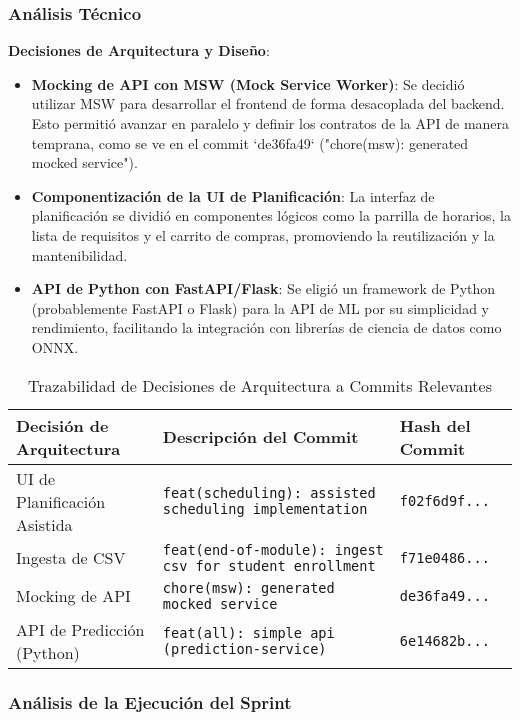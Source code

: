 \subsubsection{Análisis Técnico}

\textbf{Decisiones de Arquitectura y Diseño}:
\begin{itemize}
    \item \textbf{Mocking de API con MSW (Mock Service Worker)}: Se decidió utilizar MSW para desarrollar el frontend de forma desacoplada del backend. Esto permitió avanzar en paralelo y definir los contratos de la API de manera temprana, como se ve en el commit `de36fa49` ("chore(msw): generated mocked service").
    \item \textbf{Componentización de la UI de Planificación}: La interfaz de planificación se dividió en componentes lógicos como la parrilla de horarios, la lista de requisitos y el carrito de compras, promoviendo la reutilización y la mantenibilidad.
    \item \textbf{API de Python con FastAPI/Flask}: Se eligió un framework de Python (probablemente FastAPI o Flask) para la API de ML por su simplicidad y rendimiento, facilitando la integración con librerías de ciencia de datos como ONNX.
\end{itemize}

\begin{table}[H]
    \caption{Trazabilidad de Decisiones de Arquitectura a Commits Relevantes}
    \label{tab:sprint-8-commit-traceability}
    \begin{tabularx}{\textwidth}{@{}lXl@{}}
        \toprule
        \textbf{Decisión de Arquitectura} & \textbf{Descripción del Commit} & \textbf{Hash del Commit} \\
        \midrule
        UI de Planificación Asistida & \texttt{feat(scheduling): assisted scheduling implementation} & \texttt{f02f6d9f...} \\
        Ingesta de CSV & \texttt{feat(end-of-module): ingest csv for student enrollment} & \texttt{f71e0486...} \\
        Mocking de API & \texttt{chore(msw): generated mocked service} & \texttt{de36fa49...} \\
        API de Predicción (Python) & \texttt{feat(all): simple api (prediction-service)} & \texttt{6e14682b...} \\
        \bottomrule
    \end{tabularx}
\end{table}

\subsubsection{Análisis de la Ejecución del Sprint}

